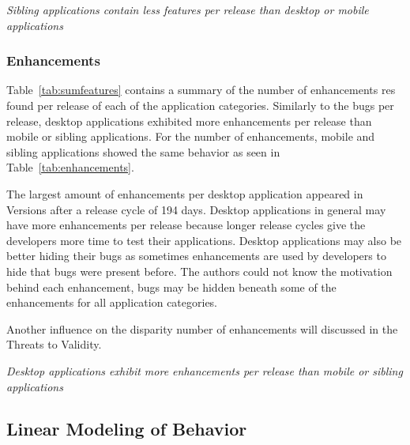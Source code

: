 \documentclass{acm_proc_article-sp}
\begin{document}
\textit{Sibling applications contain less features per release than desktop or mobile applications}
\subsubsection{Enhancements}

\begin{center}


\end{center}

\begin{center}


\end{center}

Table~\ref{tab:sumfeatures} contains a summary of the number of enhancements res found per release of each of the application categories. 
Similarly to the bugs per release, desktop applications exhibited more enhancements per release than mobile or sibling applications.
For the number of enhancements, mobile and sibling applications showed the same behavior as seen in Table~\ref{tab:enhancements}.

The largest amount of enhancements per desktop application appeared in Versions after a release cycle of 194 days.
Desktop applications in general may have more enhancements per release because longer release cycles give the developers more time to test their applications.
Desktop applications may also be better hiding their bugs as sometimes enhancements are used by developers to hide that bugs were present before.
The authors could not know the motivation behind each enhancement, bugs may be hidden beneath some of the enhancements for all application categories.

Another influence on the disparity number of enhancements will discussed in the Threats to Validity.


\textit{Desktop applications exhibit more enhancements per release than mobile or sibling applications}
\subsection{Linear Modeling of Behavior}




\begin{center}


\end{center}


\begin{center}


\end{center}
\end{document}
